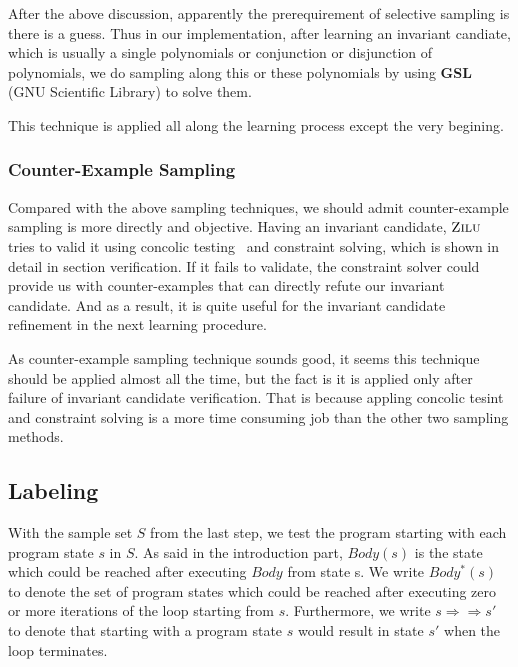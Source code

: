 After the above discussion, apparently the prerequirement of selective sampling is there is a guess.
Thus in our implementation, after learning an invariant candiate, 
which is usually a single polynomials or conjunction or disjunction of polynomials,
we do sampling along this or these polynomials by using \textbf{GSL} (GNU Scientific Library) to solve them.

This technique is applied all along the learning process except the very begining.



\subsubsection{Counter-Example Sampling}
Compared with the above sampling techniques, we should admit counter-example sampling is more directly and objective.  
Having an invariant candidate, $\textsc{Zilu}$ tries to valid it using concolic testing~\cite{} and constraint solving,
which is shown in detail in section verification.
If it fails to validate, the constraint solver could provide us with counter-examples that can directly refute our invariant candidate.
And as a result, it is quite useful for the invariant candidate refinement in the next learning procedure.

As counter-example sampling technique sounds good, it seems this technique should be applied almost all the time, 
but the fact is it is applied only after failure of invariant candidate verification.
That is because appling concolic tesint and constraint solving is a more time consuming job than the other two sampling methods.

\subsection {Labeling}
With the sample set $S$ from the last step, we test the program starting with each program state $s$ in $S$. 
As said in the introduction part, $Body(s)$ is the state which could be reached after executing $Body$ from state s.
We write $Body^*(s)$ to denote the set of program states which could be reached after executing zero or more iterations of the loop starting from $s$.
Furthermore, we write $s \Rightarrow\Rightarrow s'$ to denote that starting with a program state $s$ would result in state $s'$ when the loop terminates. 

